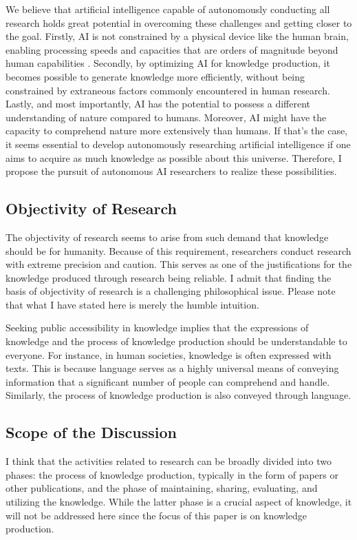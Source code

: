 \documentclass{article}
\begin{document}
We believe that artificial intelligence capable of autonomously conducting all research holds great potential in overcoming these challenges and getting closer to the goal. Firstly, AI is not constrained by a physical device like the human brain, enabling processing speeds and capacities that are orders of magnitude beyond human capabilities \cite{hope2022computational,kitano2021nobel}. Secondly, by optimizing AI for knowledge production, it becomes possible to generate knowledge more efficiently, without being constrained by extraneous factors commonly encountered in human research. Lastly, and most importantly, AI has the potential to possess a different understanding of nature compared to humans. Moreover, AI might have the capacity to comprehend nature more extensively than humans. If that's the case, it seems essential to develop autonomously researching artificial intelligence if one aims to acquire as much knowledge as possible about this universe. Therefore, I propose the pursuit of autonomous AI researchers to realize these possibilities.

\subsection{Objectivity of Research}

The objectivity of research seems to arise from such demand that knowledge should be for humanity. Because of this requirement, researchers conduct research with extreme precision and caution. This serves as one of the justifications for the knowledge produced through research being reliable. I admit that finding the basis of objectivity of research is a challenging philosophical issue. Please note that what I have stated here is merely the humble intuition.

Seeking public accessibility in knowledge implies that the expressions of knowledge and the process of knowledge production should be understandable to everyone. For instance, in human societies, knowledge is often expressed with texts. This is because language serves as a highly universal means of conveying information that a significant number of people can comprehend and handle. Similarly, the process of knowledge production is also conveyed through language.


\subsection{Scope of the Discussion}
I think that the activities related to research can be broadly divided into two phases: the process of knowledge production, typically in the form of papers or other publications, and the phase of maintaining, sharing, evaluating, and utilizing the knowledge. While the latter phase is a crucial aspect of knowledge, it will not be addressed here since the focus of this paper is on knowledge production. 
\end{document}
